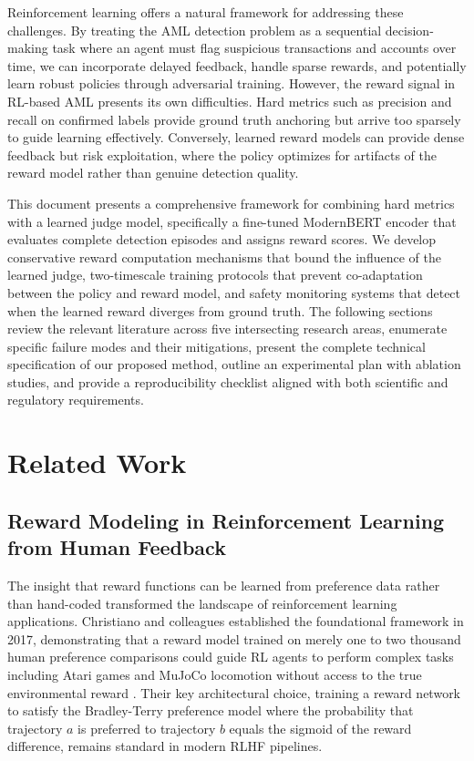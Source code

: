 \documentclass[11pt,a4paper]{article}
\begin{document}
Reinforcement learning offers a natural framework for addressing these challenges. By treating the AML detection problem as a sequential decision-making task where an agent must flag suspicious transactions and accounts over time, we can incorporate delayed feedback, handle sparse rewards, and potentially learn robust policies through adversarial training. However, the reward signal in RL-based AML presents its own difficulties. Hard metrics such as precision and recall on confirmed labels provide ground truth anchoring but arrive too sparsely to guide learning effectively. Conversely, learned reward models can provide dense feedback but risk exploitation, where the policy optimizes for artifacts of the reward model rather than genuine detection quality.

This document presents a comprehensive framework for combining hard metrics with a learned judge model, specifically a fine-tuned ModernBERT encoder that evaluates complete detection episodes and assigns reward scores. We develop conservative reward computation mechanisms that bound the influence of the learned judge, two-timescale training protocols that prevent co-adaptation between the policy and reward model, and safety monitoring systems that detect when the learned reward diverges from ground truth. The following sections review the relevant literature across five intersecting research areas, enumerate specific failure modes and their mitigations, present the complete technical specification of our proposed method, outline an experimental plan with ablation studies, and provide a reproducibility checklist aligned with both scientific and regulatory requirements.

\section{Related Work}

\subsection{Reward Modeling in Reinforcement Learning from Human Feedback}

The insight that reward functions can be learned from preference data rather than hand-coded transformed the landscape of reinforcement learning applications. Christiano and colleagues established the foundational framework in 2017, demonstrating that a reward model trained on merely one to two thousand human preference comparisons could guide RL agents to perform complex tasks including Atari games and MuJoCo locomotion without access to the true environmental reward \citep{christiano2017deep}. Their key architectural choice, training a reward network to satisfy the Bradley-Terry preference model where the probability that trajectory $a$ is preferred to trajectory $b$ equals the sigmoid of the reward difference, remains standard in modern RLHF pipelines.
\end{document}
